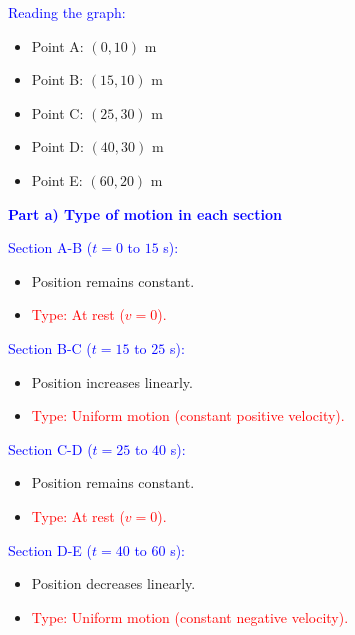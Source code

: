 \begin{exercise}
\begin{solu}
        \vspace{0.3cm}

        \textcolor{blue}{Reading the graph:}
        \begin{itemize}
            \item Point A: $(0,10)$ m
            \item Point B: $(15,10)$ m
            \item Point C: $(25,30)$ m
            \item Point D: $(40,30)$ m
            \item Point E: $(60,20)$ m
        \end{itemize}

        \textbf{\textcolor{blue}{Part a) Type of motion in each section}}

        \textcolor{blue}{Section A-B ($t=0$ to $15$ s):}
        \begin{itemize}
            \item Position remains constant.
            \item \textcolor{red}{Type: At rest ($v=0$).}
        \end{itemize}

        \textcolor{blue}{Section B-C ($t=15$ to $25$ s):}
        \begin{itemize}
            \item Position increases linearly.
            \item \textcolor{red}{Type: Uniform motion (constant positive velocity).}
        \end{itemize}

        \textcolor{blue}{Section C-D ($t=25$ to $40$ s):}
        \begin{itemize}
            \item Position remains constant.
            \item \textcolor{red}{Type: At rest ($v=0$).}
        \end{itemize}

        \textcolor{blue}{Section D-E ($t=40$ to $60$ s):}
        \begin{itemize}
            \item Position decreases linearly.
            \item \textcolor{red}{Type: Uniform motion (constant negative velocity).}
        \end{itemize}

        \vspace{0.5cm}


\end{solu}
\end{exercise}
